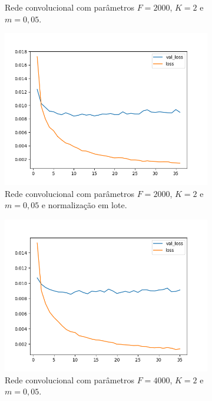 \begin{figure}[H]
\begin{subfigure}{.5\textwidth}
  \caption{Rede convolucional com parâmetros $F = 2000$, $K = 2$ e $m = 0,05$.}
  \label{fig:cnn-2000-k-2-m-005}
\end{subfigure}
\begin{subfigure}{.5\textwidth}
  \centering
  \includegraphics[width=.8\linewidth]{figuras/ape-ajustes-hiper-parametros/cnn-with-bn-2000-k-2-m-005.png}
  \caption{Rede convolucional com parâmetros $F = 2000$, $K = 2$ e $m = 0,05$ e normalização em lote.}
  \label{fig:cnn-2000-k-2-m-005-normalizacao-em-lote}
\end{subfigure}
\begin{subfigure}{.5\textwidth}
  \centering
  \includegraphics[width=.8\linewidth]{figuras/ape-ajustes-hiper-parametros/cnn-4000-k-2-m-005.png}
  \caption{Rede convolucional com parâmetros $F = 4000$, $K = 2$ e $m = 0,05$.}
  \label{fig:cnn-4000-k-2-m-005}
\end{subfigure}
\begin{subfigure}{.5\textwidth}
  \centering

\end{subfigure}
\end{figure}
